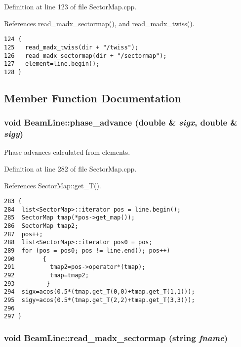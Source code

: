 Definition at line 123 of file Sector\-Map.cpp.

References read\_\-madx\_\-sectormap(), and read\_\-madx\_\-twiss().



\footnotesize\begin{verbatim}124 {
125   read_madx_twiss(dir + "/twiss");
126   read_madx_sectormap(dir + "/sectormap");
127   element=line.begin();
128 }
\end{verbatim}\normalsize 


\subsection{Member Function Documentation}
\subsubsection{\setlength{\rightskip}{0pt plus 5cm}void Beam\-Line::phase\_\-advance (double \& {\em sigx}, double \& {\em sigy})}\label{classBeamLine_a18}


Phase advances calculated from elements. 

Definition at line 282 of file Sector\-Map.cpp.

References Sector\-Map::get\_\-T().



\footnotesize\begin{verbatim}283 {
284  list<SectorMap>::iterator pos = line.begin();
285  SectorMap tmap(*pos->get_map());
286  SectorMap tmap2;
287  pos++;
288  list<SectorMap>::iterator pos0 = pos;
289  for (pos = pos0; pos != line.end(); pos++)
290        {
291          tmap2=pos->operator*(tmap);
292          tmap=tmap2;
293         }        
294  sigx=acos(0.5*(tmap.get_T(0,0)+tmap.get_T(1,1)));
295  sigy=acos(0.5*(tmap.get_T(2,2)+tmap.get_T(3,3)));
296  
297 }
\end{verbatim}\normalsize 
{}
\subsubsection{\setlength{\rightskip}{0pt plus 5cm}void Beam\-Line::read\_\-madx\_\-sectormap (string {\em fname})}\label{classBeamLine_a7}


